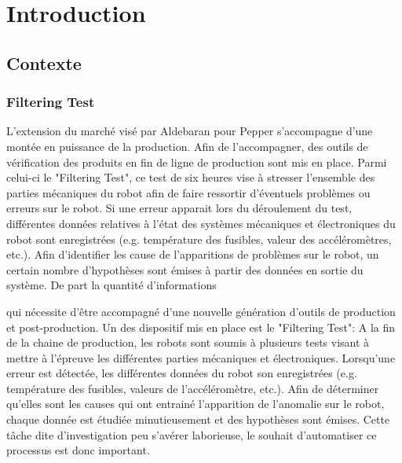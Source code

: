 \chapter{Introduction}
\label{Introduction}
\thispagestyle{fancy}

\section{Contexte}
\label{Introduction:Contexte}

\subsection{Filtering Test}
\label{Introduction:Contexte:Filtering Test}
L'extension du marché visé par Aldebaran pour Pepper s'accompagne d'une montée en puissance de la production. Afin de l'accompagner, des outils de vérification des produits en fin de ligne de production sont mis en place. Parmi celui-ci le "Filtering Test", ce test de six heures vise à stresser l'ensemble des parties mécaniques du robot afin de faire ressortir d'éventuels problèmes ou erreurs sur le robot. Si une erreur apparait lors du déroulement du test, différentes données relatives à l'état des systèmes mécaniques et électroniques du robot sont enregistrées (e.g. température des fusibles, valeur des accéléromètres, etc.). Afin d'identifier les cause de l'apparitions de problèmes sur le robot, un certain nombre d'hypothèses sont émises à partir des données en sortie du système. 
De part la quantité d'informations 


 qui nécessite d'être accompagné d'une nouvelle génération d'outils de production et post-production. Un des dispositif mis en place est le "Filtering Test": A la fin de la chaine de production, les robots sont soumis à plusieurs tests visant à mettre à l'épreuve les différentes parties mécaniques et électroniques. Lorsqu'une erreur est détectée,  les différentes données du robot son enregistrées (e.g. température des fusibles, valeurs de l'accéléromètre, etc.). Afin de déterminer qu'elles sont les causes qui ont entrainé l'apparition de l'anomalie sur le robot, chaque donnée est étudiée minutieusement et des hypothèses sont émises. Cette tâche dite d'investigation peu s'avérer laborieuse, le souhait d'automatiser ce processus est donc important.
